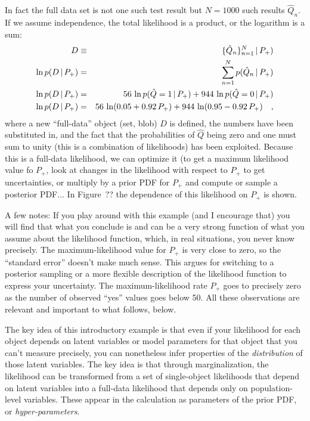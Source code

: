 \documentclass[12pt,twoside]{article}
\begin{document}
In fact the full data set is not one such test result but $N=1000$
such results $\hat{Q}_n$.  If we assume independence, the total
likelihood is a product, or the logarithm is a sum:
\begin{eqnarray}
D &\equiv& \{{\hat{Q}_n}\}_{{n=1}}^{{N}}\,|\, P_+) 
\\
\ln p(D\,|\, P_+) 
 &=& \sum_{n=1}^N p(\hat{Q}_n\,|\, P_+)
\\
\ln p(D\,|\, P_+) 
 &=& 56\,\ln p(\hat{Q}=1\,|\, P_+) + 944\,\ln p(\hat{Q}=0\,|\, P_+)
\\
\ln p(D\,|\, P_+) 
 &=& 56\,\ln (0.05 + 0.92\,P_+) + 944\,\ln (0.95 - 0.92\,P_+)
\quad,
\end{eqnarray}
where a new ``full-data'' object (set, blob) $D$ is defined, the
numbers have been substituted in, and the fact that the probabilities
of $\hat{Q}$ being zero and one must sum to unity (this is a
combination of likelihoods) has been exploited.  Because this is a
full-data likelihood, we can optimize it (to get a maximum likelihood
value fo $P_+$, look at changes in the likelihood with respect to
$P_+$ to get uncertainties, or multiply by a prior PDF for $P_+$ and
compute or sample a posterior PDF... In Figure~?? the dependence of
this likelihood on $P_+$ is shown.

A few notes: If you play around with this example (and I encourage
that) you will find that what you conclude is and can be a very strong
function of what you assume about the likelihood function, which, in
real situations, you never know precisely.  The
maximum-likelihood value for $P_+$ is very close to zero, so the
``standard error'' doesn't make much sense.  This argues for switching
to a posterior sampling or a more flexible description of the
likelihood function to express your uncertainty.  The
maximum-likelihood rate $P_+$ goes to precisely zero as the number of
observed ``yes'' values goes below 50.  All these observations are
relevant and important to what follows, below.

The key idea of this introductory example is that even if your
likelihood for each object depends on latent variables or model
parameters for that object that you can't measure precisely, you can
nonetheless infer properties of the \emph{distribution} of those
latent variables.  The key idea is that through marginalization, the
likelihood can be transformed from a set of single-object likelihoods
that depend on latent variables into a full-data likelihood that
depends only on population-level variables.  These appear in the
calculation as parameters of the prior PDF, or
\emph{hyper-parameters}.
\end{document}
